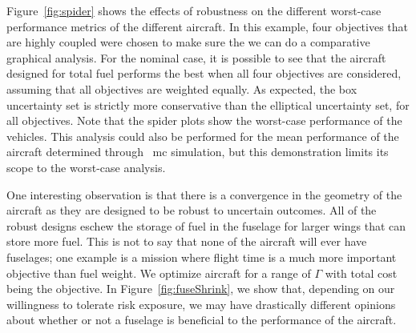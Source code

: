 Figure~\ref{fig:spider} shows the effects of robustness on
the different worst-case performance metrics of the different aircraft. In this example, four objectives that
are highly coupled were chosen to make sure the we can do a comparative graphical analysis.
For the nominal case, it is possible to see that
the aircraft designed for total fuel performs the best when all four objectives are considered,
assuming that all objectives are weighted equally. As expected,
the box uncertainty set is strictly more conservative than the elliptical uncertainty set, for
all objectives. Note that the spider plots show the worst-case performance of the vehicles.
This analysis could also be performed for the mean performance
of the aircraft determined through ~\gls{mc} simulation, but this demonstration limits
its scope to the worst-case analysis.

One interesting observation is that there is a convergence in the geometry of the aircraft as they are designed
to be robust to uncertain outcomes. All of the robust designs eschew the storage of fuel in the fuselage
for larger wings that can store more fuel. This is not to say that none of the aircraft will ever have
fuselages; one example is a mission where flight time is a much more important objective
than fuel weight. We optimize aircraft for a range of $\Gamma$ with total cost
being the objective. In Figure~\ref{fig:fuseShrink}, we show that,
depending on our willingness to tolerate risk exposure, we
may have drastically different opinions about whether or not a fuselage is beneficial
to the performance of the aircraft.

